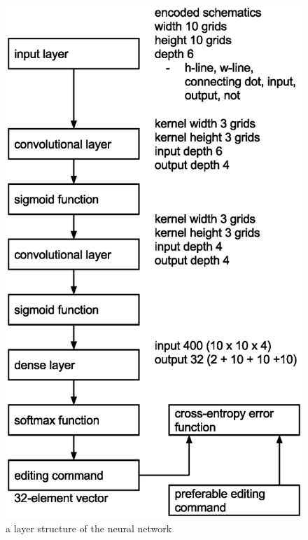 \documentclass[twocolumn]{article}
\begin{document}
\begin{figure}[tb]
 \begin{center}
  \begin{minipage}{\hsize}
   \includegraphics[width=\hsize]{layers.eps}
   \caption{a layer structure of the neural network}
   \label{fig:layers}
  \end{minipage}
 \end{center}
\end{figure}
\end{document}
